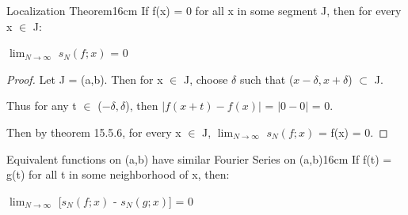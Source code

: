     \vspace{0.5cm}



    \begin{corollary}{Localization Theorem}{16cm}
        If f(x) = 0 for all x in some segment J, then for every x $\in$ J:

        \hspace{0.5cm}
        $\lim_{N \rightarrow \infty}$ $s_N(f;x)$ = 0
    \end{corollary}

    \begin{proof}
        Let J = (a,b). Then for x $\in$ J, choose $\delta$ such that
        ($x-\delta,x+\delta$) $\subset$ J.
        
        Thus for any t $\in$ ($-\delta,\delta$), then
        $|f(x+t) - f(x)|$
        = $|0-0|$ = 0.

        Then by {\color{red} theorem 15.5.6}, for every x $\in$ J,
        $\lim_{N \rightarrow \infty}$ $s_N(f;x)$ = f(x) = 0.
    \end{proof}

    \newpage



    \begin{corollary}
    {Equivalent functions on (a,b) have similar Fourier Series on (a,b)}{16cm}
        If f(t) = g(t) for all t in some neighborhood of x, then:

        \hspace{0.5cm}
        $\lim_{N \rightarrow \infty}$ [$s_N(f;x)$ - $s_N(g;x)$] = 0
    \end{corollary}

